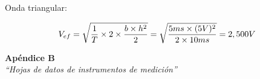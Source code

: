 \documentclass{article}
\begin{document}
Onda triangular:

\begin{center}
\begin{equation}
V_{ef} = \sqrt{{1\over T}\times 2 \times {b\times h^2 \over 2}} = \sqrt{5ms \times (5V)^2 \over 2 \times 10ms} = 2,500V
\end{equation}
\end{center}
\medskip


\newpage


\vspace*{4cm}
\begin{center}
	\textbf{\Huge{Apéndice B}} \\
	\bigskip\bigskip
	\Large{\textit{``Hojas de datos de instrumentos de medición''}}
\end{center}

\newpage \textit{}
\newpage
\end{document}
